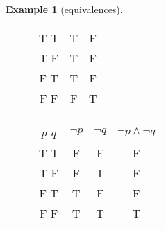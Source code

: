 \documentclass[letterpaper,10pt]{article}
\theoremstyle{plain}
\theoremstyle{definition}
\newtheorem{exmp}[thm]{Example}
\theoremstyle{remark}
\providecommand{\land}{\ensuremath{\wedge}}
\begin{document}
\begin{exmp}[equivalences]
\begin{figure}[htb]
\begin{minipage}{1.7in}
\begin{center}
\begin{tabular}{ | c | c | c |}
 \hline
  T T &T &F\\ 
  T F & T&F\\ 
  F T & T&F \\ 
  F F &F &T \\ 
  \hline
\end{tabular}
        \end{center}
    \end{minipage}
    \begin{minipage}{1.7in}
        \begin{center}
        \begin{tabular}{ | c | c | c |c |} 
  \hline
 $p$ $q$ & $\lnot p$ & $\lnot q$ & $ \lnot p \land \lnot q$ \\
 \hline
  T T & F& F& F \\ 
  T F &F & T&F \\ 
  F T & T& F& F\\ 
  F F &T & T& T\\ 
  \hline
\end{tabular}
        \end{center}
    \end{minipage}
    
\end{figure} 

\end{exmp}
\end{document}
